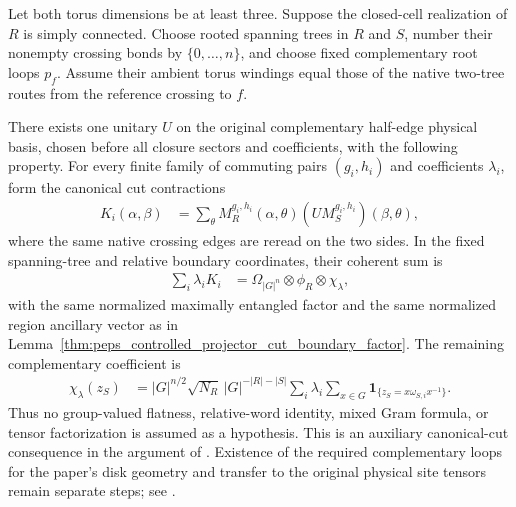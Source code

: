 \begin{lemma}%
    \label{thm:peps_torus_controlled_boundary_factor}
    \leanok
    Let both torus dimensions be at least three. Suppose the
    closed-cell realization of $R$ is simply connected. Choose rooted
    spanning trees in $R$ and $S$, number their nonempty crossing bonds
    by $\{0,\ldots,n\}$, and choose fixed complementary root
    loops $p_f$. Assume their ambient torus windings equal those of
    the native two-tree routes from the reference crossing to $f$.

    There exists one unitary $U$ on the original complementary
    half-edge physical basis, chosen before all closure sectors and
    coefficients, with the following property. For every finite family
    of commuting pairs $(g_i,h_i)$ and coefficients $\lambda_i$, form
    the canonical cut contractions
    \begin{align}
        K_i(\alpha,\beta)
         & =\sum_{\theta}
        M_R^{g_i,h_i}(\alpha,\theta)
        (UM_S^{g_i,h_i})(\beta,\theta),
        \label{eq:peps_torus_canonical_cut_contraction}
    \end{align}
    where the same native crossing edges are reread on the two sides.
    In the fixed spanning-tree and relative boundary coordinates,
    their coherent sum is
    \begin{align}
        \sum_i\lambda_i K_i
         & =\Omega_{|G|^n}\otimes\phi_R\otimes\chi_{\lambda},
    \end{align}
    with the same normalized maximally entangled factor and the same
    normalized region ancillary vector as in
    Lemma~\ref{thm:peps_controlled_projector_cut_boundary_factor}.
    The remaining complementary coefficient is
    \begin{align}
        \chi_{\lambda}(z_S)
         & =|G|^{n/2}\sqrt{N_R}\,|G|^{-|R|-|S|}
        \sum_i\lambda_i\sum_{x\in G}
        \mathbf 1_{\{z_S=x\omega_{S,i}x^{-1}\}}.
    \end{align}
    Thus no group-valued flatness, relative-word identity, mixed Gram
    formula, or tensor factorization is assumed as a hypothesis.
    This is an auxiliary canonical-cut consequence in the argument of
    \cite[Theorem~6.9]{Schuch2010PEPS}. Existence of the required
    complementary loops for the paper's disk geometry and transfer
    to the original physical site tensors remain separate steps;
    see \cite{gap:rmp_peps_quantum_double_g_isometry}.
\end{lemma}

